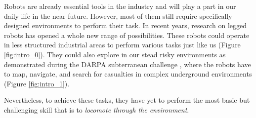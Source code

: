 



Robots are already essential tools in the industry and will play a part in our daily life in the near future.
However, most of them still require specifically designed environments to perform their task.
In recent years, research on legged robots has opened a whole new range of possibilities. %
These robots could operate in less structured industrial areas to perform various tasks just like us (Figure \ref{fig:intro_0}). They could also explore in our stead risky environments as demonstrated during the DARPA subterranean challenge \cite{darpa_nasa_2021, darpa_hutter_2022}, where the robots have to map, navigate, and search for casualties in complex underground environments (Figure \ref{fig:intro_1}).

Nevertheless, to achieve these tasks, they have yet to perform the most basic but challenging skill that is to \textit{locomote through the environment}.


